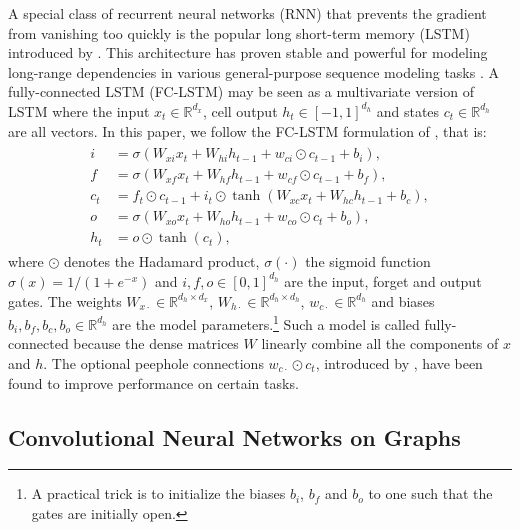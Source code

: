 \documentclass{article} %
\newcommand{\R}{\mathbb{R}}
\begin{document}
A special class of recurrent neural networks (RNN) that prevents the gradient from vanishing
too quickly is the popular long short-term memory (LSTM) introduced by \citet{lstm}. This architecture has proven stable and powerful for modeling long-range dependencies in various general-purpose sequence modeling tasks
\citep{seq_graves, moving_mnist, seq2seq}. A fully-connected LSTM (FC-LSTM) may
be seen as a multivariate version of LSTM where the input $x_t \in \R^{d_x}$,
cell output $h_t \in [-1,1]^{d_h}$ and states $c_t \in \R^{d_h}$ are all
vectors. In this paper, we follow the FC-LSTM formulation of
\citet{seq_graves}, that is:
\begin{align} \label{eqn:lstm_fc}
\begin{split}
	i &= \sigma(W_{xi} x_t + W_{hi} h_{t-1} + w_{ci} \odot c_{t-1} + b_i), \\
	f &= \sigma(W_{xf} x_t + W_{hf} h_{t-1} + w_{cf} \odot c_{t-1} + b_f), \\
	c_t &= f_t \odot c_{t-1} + i_t \odot \tanh(W_{xc} x_t + W_{hc} h_{t-1} + b_c), \\
	o &= \sigma(W_{xo} x_t + W_{ho} h_{t-1} + w_{co} \odot c_t + b_o), \\
	h_t &= o \odot \tanh(c_t),
\end{split}
\end{align}
where $\odot$ denotes the Hadamard product, $\sigma(\cdot)$ the sigmoid
function $\sigma(x) = 1 / (1+e^{-x})$ and $i, f, o \in [0,1]^{d_h}$ are the
input, forget and output gates. The weights $W_{x\cdot} \in \R^{d_h \times
d_x}$, $W_{h\cdot} \in \R^{d_h \times d_h}$, $w_{c\cdot} \in \R^{d_h}$ and
biases $b_i, b_f, b_c, b_o \in \R^{d_h}$ are the model parameters.\footnote{A
practical trick is to initialize the biases $b_i$, $b_f$ and $b_o$ to one such
that the gates are initially open.} Such a model is called fully-connected
because the dense matrices $W$ linearly combine all the components of $x$ and
$h$. The optional peephole connections $w_{c\cdot} \odot c_t$, introduced by
\citet{peephole}, have been found to improve performance on certain tasks.


\subsection{Convolutional Neural Networks on Graphs} \label{sec:graphconv}
\end{document}
